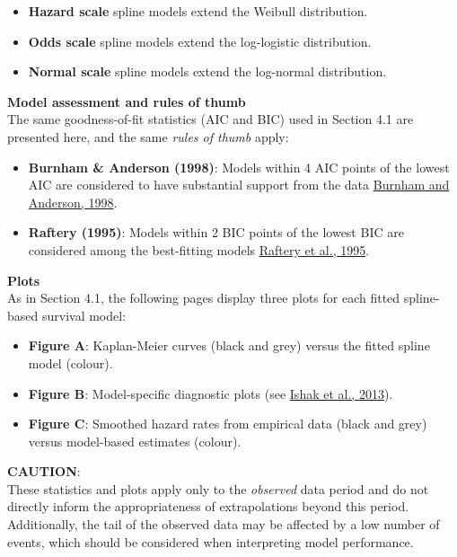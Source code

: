\documentclass[
]{article}
\providecommand{\tightlist}{%
  \setlength{\itemsep}{0pt}\setlength{\parskip}{0pt}}
\begin{document}
\begin{itemize}
\tightlist
\item
  \textbf{Hazard scale} spline models extend the Weibull distribution.\\
\item
  \textbf{Odds scale} spline models extend the log-logistic
  distribution.\\
\item
  \textbf{Normal scale} spline models extend the log-normal
  distribution.
\end{itemize}

\textbf{Model assessment and rules of thumb}\\
The same goodness-of-fit statistics (AIC and BIC) used in Section 4.1
are presented here, and the same \emph{rules of thumb} apply:

\begin{itemize}
\tightlist
\item
  \textbf{Burnham \& Anderson (1998)}: Models within 4 AIC points of the
  lowest AIC are considered to have substantial support from the data
  \href{https://doi.org/10.1007/978-1-4757-2917-7}{Burnham and Anderson,
  1998}.\\
\item
  \textbf{Raftery (1995)}: Models within 2 BIC points of the lowest BIC
  are considered among the best-fitting models
  \href{https://doi.org/10.2307/271063}{Raftery et al., 1995}.
\end{itemize}

\textbf{Plots}\\
As in Section 4.1, the following pages display three plots for each
fitted spline-based survival model:

\begin{itemize}
\tightlist
\item
  \textbf{Figure A}: Kaplan-Meier curves (black and grey) versus the
  fitted spline model (colour).\\
\item
  \textbf{Figure B}: Model-specific diagnostic plots (see
  \href{https://doi.org/10.1007/s40273-013-0064-3}{Ishak et al.,
  2013}).\\
\item
  \textbf{Figure C}: Smoothed hazard rates from empirical data (black
  and grey) versus model-based estimates (colour).
\end{itemize}

\textbf{CAUTION}:\\
These statistics and plots apply only to the \emph{observed} data period
and do not directly inform the appropriateness of extrapolations beyond
this period.\\
Additionally, the tail of the observed data may be affected by a low
number of events, which should be considered when interpreting model
performance.
\end{document}
